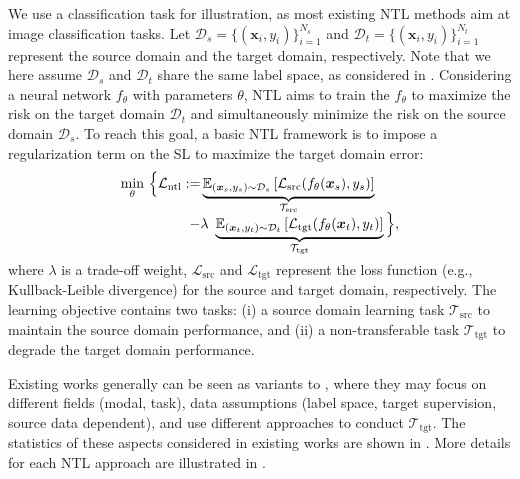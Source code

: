 We use a classification task for illustration, as most existing NTL methods aim at image classification tasks. 
Let $\mathcal{D}_s=\{(\boldsymbol{x}_i,y_i)\}_{i=1}^{N_s}$ and $\mathcal{D}_t=\{(\boldsymbol{x}_i,y_i)\}_{i=1}^{N_t}$ represent the source domain and the target domain, respectively. Note that we here assume $\mathcal{D}_s$ and $\mathcal{D}_t$ share the same label space, as considered in \cite{wang2021non}.
Considering a neural network $f_{\theta}$ with parameters $\theta$, NTL aims to train the $f_{\theta}$ to maximize the risk on the target domain $\mathcal{D}_t$ and simultaneously minimize the risk on the source domain $\mathcal{D}_s$. 
To reach this goal, a basic NTL framework is to impose a regularization term on the SL to maximize the target domain error:
\vspace{-1.5mm}
\begin{equation}
    \begin{aligned}
 {\underset{\theta}{\min}}\ \Big\{ \mathcal{L}_{\text{ntl}} := & \underbrace{\mathbb{E}_{(\boldsymbol{x}_s,y_s)\sim \mathcal{D}_s}\left[ \mathcal{L}_{\text{src}}(f_{\theta}(\boldsymbol{x}_s), y_s)\right]}_{\mathcal{T}_{\text{src}}} \\
 \noalign{\vskip -5pt}
 - & \lambda\ \underbrace{\mathbb{E}_{(\boldsymbol{x}_t,y_t)\sim \mathcal{D}_t}\left[ \mathcal{L}_{\text{tgt}}(f_{\theta}(\boldsymbol{x}_t), y_t)\right]}_{\mathcal{T}_{\text{tgt}}} \Big\}, \\
    \noalign{\vskip -3pt}
    \end{aligned}
    \label{eq:ntlframe}
\end{equation}
where $\lambda$ is a trade-off weight, $\mathcal{L}_{\text{src}}$ and $\mathcal{L}_{\text{tgt}}$ represent the loss function (e.g., Kullback-Leible divergence) for the source and target domain, respectively. 
The learning objective contains two tasks: (i) a source domain learning task $\mathcal{T}_{\text{src}}$ to maintain the source domain performance, and (ii) a non-transferable task $\mathcal{T}_{\text{tgt}}$ to degrade the target domain performance.


Existing works generally can be seen as variants to , where they may focus on different fields (modal, task), data assumptions (label space, target supervision, source data dependent), and use different approaches to conduct $\mathcal{T}_{\text{tgt}}$. The statistics of these aspects considered in existing works are shown in . More details for each NTL approach are illustrated in .




